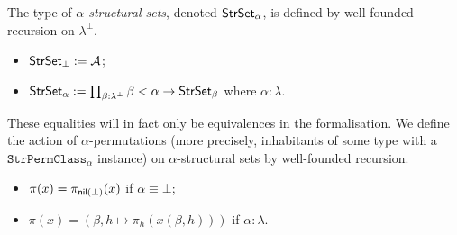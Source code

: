\begin{definition}
  \label{def:StrSet}
  The type of \emph{\( \alpha \)-structural sets}, denoted \( \mathsf{StrSet}_\alpha \), is defined by well-founded recursion on \( \lambda^\bot \).
  \begin{itemize}
    \item \( \mathsf{StrSet}_\bot := {\mathcal A} \);
    \item \( \mathsf{StrSet}_\alpha := \prod_{\beta : \lambda^\bot} \beta < \alpha \to \mathsf{StrSet}_\beta \) where \( \alpha : \lambda \).
  \end{itemize}
  These equalities will in fact only be equivalences in the formalisation.
  We define the action of \( \alpha \)-permutations (more precisely, inhabitants of some type with a \( \texttt{StrPermClass}_\alpha \) instance) on \( \alpha \)-structural sets by well-founded recursion.
  \begin{itemize}
    \item \( \pi(x) = \pi_{\operatorname{\mathsf{nil}}(\bot)}(x) \) if \( \alpha \equiv \bot \);
    \item \( \pi(x) = (\beta, h \mapsto \pi_h(x(\beta, h))) \) if \( \alpha : \lambda \).
  \end{itemize}
\end{definition}


